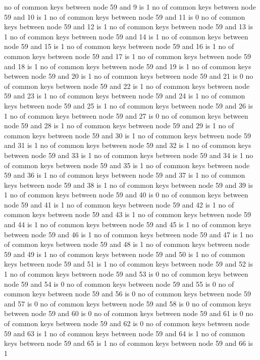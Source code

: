 no of common keys between node 59 and 9 is 1
no of common keys between node 59 and 10 is 1
no of common keys between node 59 and 11 is 0
no of common keys between node 59 and 12 is 1
no of common keys between node 59 and 13 is 1
no of common keys between node 59 and 14 is 1
no of common keys between node 59 and 15 is 1
no of common keys between node 59 and 16 is 1
no of common keys between node 59 and 17 is 1
no of common keys between node 59 and 18 is 1
no of common keys between node 59 and 19 is 1
no of common keys between node 59 and 20 is 1
no of common keys between node 59 and 21 is 0
no of common keys between node 59 and 22 is 1
no of common keys between node 59 and 23 is 1
no of common keys between node 59 and 24 is 1
no of common keys between node 59 and 25 is 1
no of common keys between node 59 and 26 is 1
no of common keys between node 59 and 27 is 0
no of common keys between node 59 and 28 is 1
no of common keys between node 59 and 29 is 1
no of common keys between node 59 and 30 is 1
no of common keys between node 59 and 31 is 1
no of common keys between node 59 and 32 is 1
no of common keys between node 59 and 33 is 1
no of common keys between node 59 and 34 is 1
no of common keys between node 59 and 35 is 1
no of common keys between node 59 and 36 is 1
no of common keys between node 59 and 37 is 1
no of common keys between node 59 and 38 is 1
no of common keys between node 59 and 39 is 1
no of common keys between node 59 and 40 is 0
no of common keys between node 59 and 41 is 1
no of common keys between node 59 and 42 is 1
no of common keys between node 59 and 43 is 1
no of common keys between node 59 and 44 is 1
no of common keys between node 59 and 45 is 1
no of common keys between node 59 and 46 is 1
no of common keys between node 59 and 47 is 1
no of common keys between node 59 and 48 is 1
no of common keys between node 59 and 49 is 1
no of common keys between node 59 and 50 is 1
no of common keys between node 59 and 51 is 1
no of common keys between node 59 and 52 is 1
no of common keys between node 59 and 53 is 0
no of common keys between node 59 and 54 is 0
no of common keys between node 59 and 55 is 0
no of common keys between node 59 and 56 is 0
no of common keys between node 59 and 57 is 0
no of common keys between node 59 and 58 is 0
no of common keys between node 59 and 60 is 0
no of common keys between node 59 and 61 is 0
no of common keys between node 59 and 62 is 0
no of common keys between node 59 and 63 is 1
no of common keys between node 59 and 64 is 1
no of common keys between node 59 and 65 is 1
no of common keys between node 59 and 66 is 1
